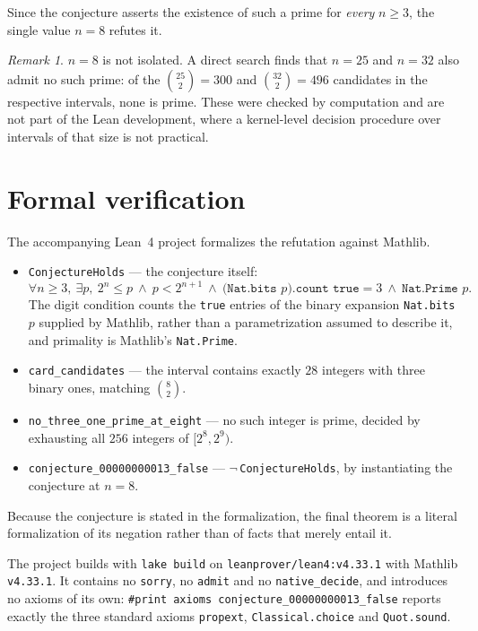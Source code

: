 \documentclass[11pt]{article}
\theoremstyle{plain}
\theoremstyle{remark}
\newtheorem{remark}[theorem]{Remark}
\begin{document}
Since the conjecture asserts the existence of such a prime for \emph{every}
$n\ge3$, the single value $n=8$ refutes it.

\begin{remark}
$n=8$ is not isolated. A direct search finds that $n=25$ and $n=32$ also admit
no such prime: of the $\binom{25}2=300$ and $\binom{32}2=496$ candidates in the
respective intervals, none is prime. These were checked by computation and are
not part of the Lean development, where a kernel-level decision procedure over
intervals of that size is not practical.
\end{remark}

\section{Formal verification}

The accompanying Lean~4 project formalizes the refutation against Mathlib.

\begin{itemize}
  \item \texttt{ConjectureHolds} --- the conjecture itself:
    \[
      \forall n\ge3,\ \exists p,\
      2^n\le p\ \wedge\ p<2^{n+1}\ \wedge\
      \texttt{(Nat.bits }p\texttt{).count true}=3\ \wedge\ \texttt{Nat.Prime }p .
    \]
    The digit condition counts the \texttt{true} entries of the binary
    expansion \texttt{Nat.bits}\,$p$ supplied by Mathlib, rather than a
    parametrization assumed to describe it, and primality is Mathlib's
    \texttt{Nat.Prime}.
  \item \texttt{card\_candidates} --- the interval contains exactly $28$
    integers with three binary ones, matching $\binom82$.
  \item \texttt{no\_three\_one\_prime\_at\_eight} --- no such integer is prime,
    decided by exhausting all $256$ integers of $[2^8,2^9)$.
  \item \texttt{conjecture\_00000000013\_false} --- $\lnot$\,\texttt{ConjectureHolds},
    by instantiating the conjecture at $n=8$.
\end{itemize}

Because the conjecture is stated in the formalization, the final theorem is a
literal formalization of its negation rather than of facts that merely entail
it.

The project builds with \texttt{lake build} on
\texttt{leanprover/lean4:v4.33.1} with Mathlib \texttt{v4.33.1}. It contains no
\texttt{sorry}, no \texttt{admit} and no \texttt{native\_decide}, and
introduces no axioms of its own:
\texttt{\#print axioms conjecture\_00000000013\_false} reports exactly the
three standard axioms \texttt{propext}, \texttt{Classical.choice} and
\texttt{Quot.sound}.
\end{document}
